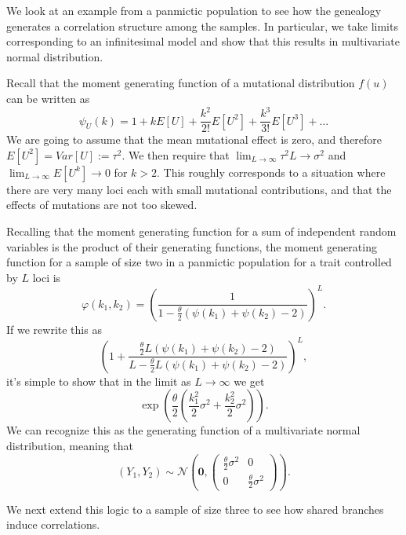 We look at an example from a panmictic population to see how the genealogy generates a correlation structure among the
samples. In particular, we take limits corresponding to an infinitesimal model and show that this results in multivariate 
normal distribution. 

Recall that the moment generating function of a mutational distribution $f(u)$ can be written as 
\begin{equation*}
  \psi_{U}(k) = 1 + kE\left[ U \right] + \frac{k^2}{2!}E\left[ U^2 \right] + \frac{k^3}{3!}E\left[ U^3\right] + \ldots
\end{equation*}
We are going to assume that the mean mutational effect is zero, and therefore $E[U^2]=Var[U]:=\tau^2$. We then require
that $\lim_{L \to \infty}\tau^2L \to \sigma^2$ and $\lim_{L \to \infty}E[U^k] \to 0$ for $k>2$. This roughly corresponds
to a situation where there are very many loci each with small mutational contributions, and that the effects of
mutations are not too skewed. 

Recalling that the moment generating function for a sum of independent random variables is the product of their
generating functions, the moment generating function for a sample of size two in a panmictic population for a trait
controlled by $L$ loci is
\begin{equation}
  \label{eq:two}
  \varphi(k_1,k_2) = \left( \frac{1}{1-\frac{\theta}{2}(\psi(k_1)+\psi(k_2)-2)}\right)^L.
\end{equation}
If we rewrite this as
\begin{equation*}
  \left( 1 + \frac{\frac{\theta}{2}L(\psi(k_1) + \psi(k_2) -2)}{L-\frac{\theta}{2}L(\psi(k_1) + \psi(k_2) -2)}\right)^L,
\end{equation*}
it's simple to show that in the limit as $L \to \infty$ we get 
\begin{equation}
  \label{eq:limexp}
  \exp\left( \frac{\theta}{2} \left( \frac{k_1^2}{2}\sigma^2 + \frac{k_2^2}{2}\sigma^2 \right)\right).
\end{equation}
We can recognize this as the generating function of a multivariate normal distribution, meaning that 
\begin{equation}
  \label{eq:twodist}
  (Y_1,Y_2) \sim \mathcal{N}\left( \mathbf{0},
    \begin{pmatrix}
      \frac{\theta}{2}\sigma^2 & 0 \\
      0 & \frac{\theta}{2}\sigma^2
    \end{pmatrix}
  \right).
\end{equation}

We next extend this logic to a sample of size three to see how shared branches induce correlations.

